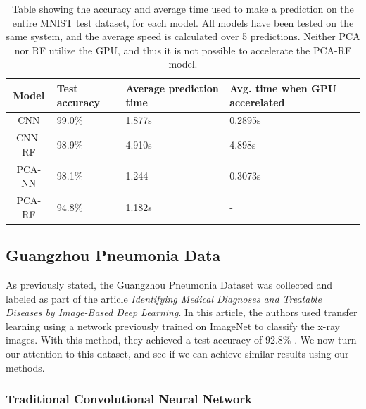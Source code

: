 \documentclass[onecolumn,10pt,cleanfoot]{asme2ej}
\begin{document}
\begin{table}[H]
\caption{Table showing the accuracy and average time used to make a prediction on the entire MNIST test dataset, for each model. All models have been tested on the same system, and the average speed is calculated over 5 predictions. Neither PCA nor RF utilize the GPU, and thus it is not possible to accelerate the PCA-RF model.}
\begin{center}
\label{modcompmnist}
\begin{tabular}{| c | l | l | l |}
\hline
Model & Test accuracy & Average prediction time & Avg. time when GPU accerelated \\
\hline
CNN & 99.0\% & 1.877s & 0.2895s \\
CNN-RF & 98.9\% & 4.910s & 4.898s \\
PCA-NN & 98.1\% & 1.244 & 0.3073s \\
PCA-RF & 94.8\% & 1.182s & - \\
\hline
\end{tabular}
\end{center}
\end{table}

\subsection{Guangzhou Pneumonia Data}

As previously stated, the Guangzhou Pneumonia Dataset was collected and labeled as part of the article {\it Identifying Medical Diagnoses and Treatable Diseases by Image-Based Deep Learning}. In this article, the authors used transfer learning using a network previously trained on ImageNet to classify the x-ray images. With this method, they achieved a test accuracy of $92.8\%$ \cite[1127]{xray}. We now turn our attention to this dataset, and see if we can achieve similar results using our methods.

\subsubsection{Traditional Convolutional Neural Network}
\end{document}

